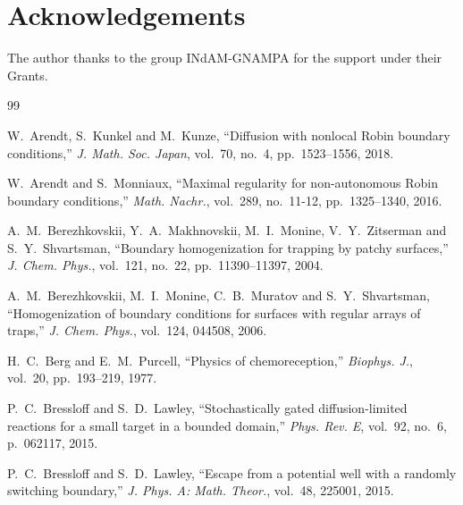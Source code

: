 \documentclass[11pt]{amsart}
\theoremstyle{plain}
\theoremstyle{definition}
\theoremstyle{remark}
\begin{document}
	
	\section*{Acknowledgements}
	The author thanks to the group INdAM-GNAMPA for the support under their Grants.\\
	
	\begin{thebibliography}{99}
		
		W.~Arendt, S.~Kunkel and M.~Kunze, ``Diffusion with nonlocal Robin boundary conditions,'' \textit{J. Math. Soc. Japan}, vol.~70, no.~4, pp.~1523--1556, 2018.
		
		W.~Arendt and S.~Monniaux, ``Maximal regularity for non-autonomous Robin boundary conditions,'' \textit{Math. Nachr.}, vol.~289, no.~11-12, pp.~1325--1340, 2016.
		
		A.~M.~Berezhkovskii, Y.~A.~Makhnovskii, M.~I.~Monine, V.~Y.~Zitserman and S.~Y.~Shvartsman, ``Boundary homogenization for trapping by patchy surfaces,'' \textit{J. Chem. Phys.}, vol.~121, no.~22, pp.~11390--11397, 2004.
		
		A.~M.~Berezhkovskii, M.~I.~Monine, C.~B.~Muratov and S.~Y.~Shvartsman, ``Homogenization of boundary conditions for surfaces with regular arrays of traps,'' \textit{J. Chem. Phys.}, vol.~124, 044508, 2006.
		
		H.~C.~Berg and E.~M.~Purcell, ``Physics of chemoreception,'' \textit{Biophys. J.}, vol.~20, pp.~193--219, 1977.
		
		
		P.~C.~Bressloff and S.~D.~Lawley, ``Stochastically gated diffusion-limited reactions for a small target in a bounded domain,'' \textit{Phys. Rev. E}, vol.~92, no.~6, p.~062117, 2015.
		
		P.~C.~Bressloff and S.~D.~Lawley, ``Escape from a potential well with a randomly switching boundary,'' \textit{J. Phys. A: Math. Theor.}, vol.~48, 225001, 2015.
		

\end{thebibliography}
\end{document}
